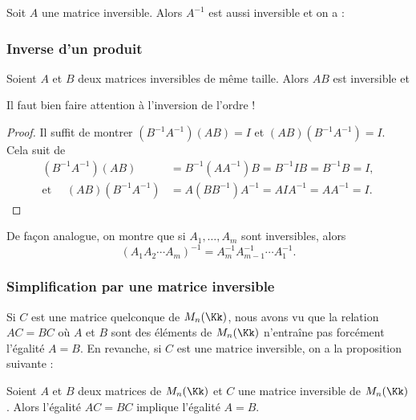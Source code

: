 \documentclass[class=report,crop=false]{standalone}
\begin{document}
\begin{proposition}
Soit $A$ une matrice inversible. Alors
$A^{-1}$ est aussi inversible et on a :
\end{proposition}


\subsubsection{Inverse d'un produit}


\begin{proposition}
 Soient $A$ et $B$ deux matrices inversibles de même taille. Alors
 $AB$ est inversible et
\end{proposition}

Il faut bien faire attention à l'inversion de l'ordre !

\begin{proof}
  Il suffit de montrer $(B^{-1}A^{-1}) (AB) = I$ et $(AB) (B^{-1} A^{-1}) = I$.
 Cela suit de
 \begin{align*}
   (B^{-1}A^{-1}) (AB) &= B^{-1}(AA^{-1})B = B^{-1}IB=B^{-1}B=I,\\
   \text{et } \quad (AB)(B^{-1} A^{-1}) &= A(BB^{-1})A^{-1} = A I A^{-1} = A A^{-1} = I.
 \end{align*}
\end{proof}


De façon analogue, on montre que si $A_1, \dots , A_m$ sont inversibles, alors
\[(A_1 A_2 \cdots A_m)^{-1} = A_m^{-1} A_{m-1}^{-1} \cdots A^{-1}_1.\]



\subsubsection{Simplification par une matrice inversible}

Si $C$ est une matrice quelconque de $M_{n}(\Kk)$, nous avons vu
que  la relation  $AC=BC$
où $A$ et $B$ sont des éléments de  $M_{n}(\Kk)$
n'entraîne pas forcément l'égalité $A=B$.
En revanche, si $C$ est une matrice inversible, on a la proposition suivante :

\begin{proposition}
Soient $A$ et $B$ deux matrices de $M_{n}(\Kk)$ et $C$ une matrice
inversible de $M_{n}(\Kk)$.
Alors l'égalité $AC=BC$ implique l'égalité $A=B$.
\end{proposition}
\end{document}
